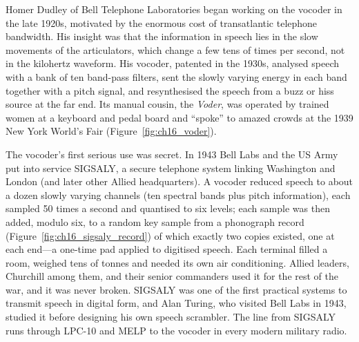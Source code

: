 \begin{history}
Homer Dudley of Bell Telephone Laboratories began working on the vocoder in the late 1920s,
motivated by the enormous cost of transatlantic telephone bandwidth. His insight was that the
information in speech lies in the slow movements of the articulators, which change a few tens of
times per second, not in the kilohertz waveform. His vocoder, patented in the 1930s, analysed speech
with a bank of ten band-pass filters, sent the slowly varying energy in each band together with a
pitch signal, and resynthesised the speech from a buzz or hiss source at the far end. Its manual
cousin, the \emph{Voder}, was operated by trained women at a keyboard and pedal board and ``spoke''
to amazed crowds at the 1939 New York World's Fair (Figure~\ref{fig:ch16_voder}).

The vocoder's first serious use was secret. In 1943 Bell Labs and the US Army put into service
SIGSALY, a secure telephone system linking Washington and London (and later other Allied
headquarters). A vocoder reduced speech to about a dozen slowly varying channels (ten spectral bands
plus pitch information), each sampled 50 times a second and quantised to six levels; each sample was
then added, modulo six, to a random key sample from a phonograph record (Figure~\ref{fig:ch16_sigsaly_record}) of which exactly two copies
existed, one at each end---a one-time pad applied to digitised speech. Each terminal filled a room,
weighed tens of tonnes and needed its own air conditioning. Allied leaders, Churchill among them, and
their senior commanders used it for the rest of the war, and it was never broken. SIGSALY was one of
the first practical systems to transmit speech in digital form, and Alan Turing, who visited Bell
Labs in 1943, studied it before designing his own speech scrambler. The line from SIGSALY runs
through LPC-10 and MELP to the vocoder in every modern military radio.
\end{history}

